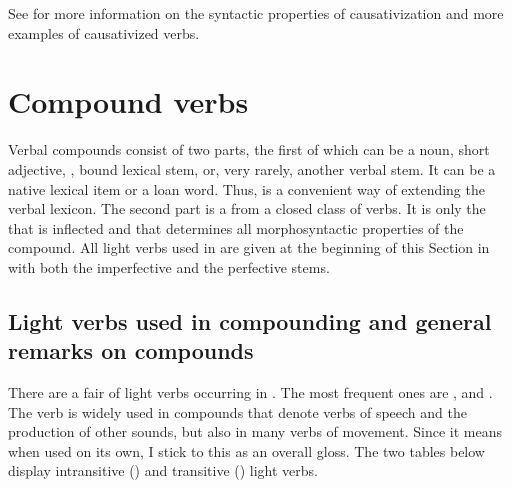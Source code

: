 See  for more information on the syntactic properties of causativization and more examples of causativized verbs.

\section{Compound verbs}
\label{sec:Compound verbs}
Verbal compounds consist of two parts, the first of which can be a noun, short adjective, , bound lexical stem, or, very rarely, another verbal stem. It can be a native lexical item or a loan word. Thus,  is a convenient way of extending the verbal lexicon. The second part is a  from a closed class of verbs. It is only the  that is inflected and that determines all morphosyntactic properties of the compound. All light verbs used in  are given at the beginning of this Section in  with both the imperfective and the perfective stems.


\subsection{Light verbs used in compounding and general remarks on compounds}
\label{sec:Light verbs used in compounding and general remarks on compounds}

There are a fair  of light verbs occurring in . The most frequent ones are  ,   and  . The verb  is widely used in compounds that denote verbs of speech and the production of other sounds, but also in many verbs of movement. Since it means  when used on its own, I stick to this as an overall gloss. The two tables below display intransitive () and transitive () light verbs.

